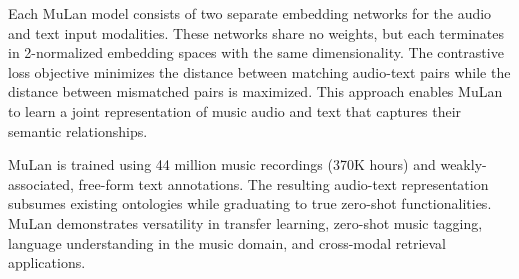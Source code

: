 Each MuLan model consists of two separate embedding networks for the audio and text input modalities. These networks share no weights, but each terminates in 2-normalized embedding spaces with the same dimensionality. The contrastive loss objective minimizes the distance between matching audio-text pairs while the distance between mismatched pairs is maximized. This approach enables MuLan to learn a joint representation of music audio and text that captures their semantic relationships.

MuLan is trained using 44 million music recordings (370K hours) and weakly-associated, free-form text annotations. The resulting audio-text representation subsumes existing ontologies while graduating to true zero-shot functionalities. MuLan demonstrates versatility in transfer learning, zero-shot music tagging, language understanding in the music domain, and cross-modal retrieval applications.